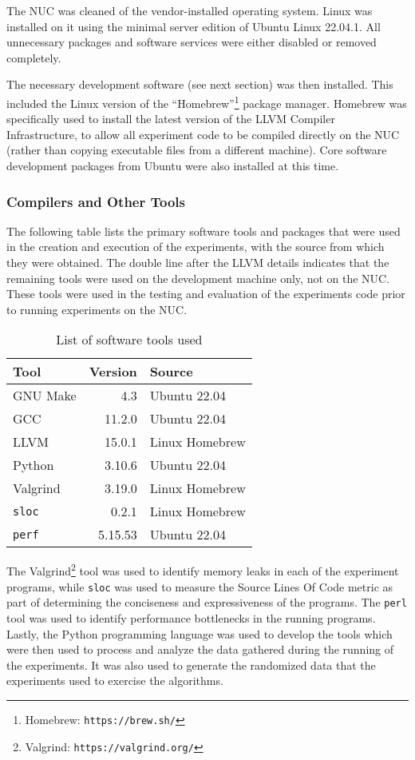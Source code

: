 The NUC was cleaned of the vendor-installed operating system. Linux was installed on it using the minimal server edition of Ubuntu Linux 22.04.1. All unnecessary packages and software services were either disabled or removed completely.

The necessary development software (see next section) was then installed. This included the Linux version of the ``Homebrew''\footnote{Homebrew: \texttt{https://brew.sh/}} package manager. Homebrew was specifically used to install the latest version of the LLVM Compiler Infrastructure, to allow all experiment code to be compiled directly on the NUC (rather than copying executable files from a different machine). Core software development packages from Ubuntu were also installed at this time.

\subsubsection{Compilers and Other Tools}

The following table lists the primary software tools and packages that were used in the creation and execution of the experiments, with the source from which they were obtained. The double line after the LLVM details indicates that the remaining tools were used on the development machine only, not on the NUC. These tools were used in the testing and evaluation of the experiments code prior to running experiments on the NUC.

\begin{table}[h!]
\begin{center}
\begin{tabular}{|l|r|l|}
\hline
Tool & Version & Source\\
\hline
GNU Make & 4.3 & Ubuntu 22.04\\
GCC & 11.2.0 & Ubuntu 22.04\\
LLVM & 15.0.1 & Linux Homebrew\\
\hline
\hline
Python & 3.10.6 & Ubuntu 22.04\\
Valgrind & 3.19.0 & Linux Homebrew\\
\texttt{sloc} & 0.2.1 & Linux Homebrew\\
\texttt{perf} & 5.15.53 & Ubuntu 22.04\\
\hline
\end{tabular}
\caption{List of software tools used}
\end{center}
\label{table:tools}
\end{table}

The Valgrind\footnote{Valgrind: \texttt{https://valgrind.org/}} tool was used to identify memory leaks in each of the experiment programs, while \texttt{sloc} was used to measure the Source Lines Of Code metric as part of determining the conciseness and expressiveness of the programs. The \texttt{perl} tool was used to identify performance bottlenecks in the running programs. Lastly, the Python programming language was used to develop the tools which were then used to process and analyze the data gathered during the running of the experiments. It was also used to generate the randomized data that the experiments used to exercise the algorithms.